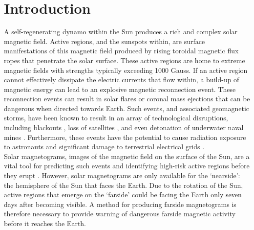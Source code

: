 \documentclass[11pt,a4paper,onecolumn]{report}
\begin{document}





\tableofcontents









%
%
%
%
\chapter{Introduction}
%
%
%
%

A self-regenerating dynamo within the Sun produces a rich and complex solar
magnetic field. Active regions, and the sunspots within, are surface
manifestations of this magnetic field produced by rising toroidal magnetic flux
ropes that penetrate the solar surface. These active regions are home to extreme
magnetic fields with strengths typically exceeding 1000 Gauss. If an active
region cannot effectively dissipate the electric currents that flow within, a
build-up of magnetic energy can lead to an explosive magnetic reconnection
event. These reconnection events can result in solar flares or coronal mass
ejections that can be dangerous when directed towards Earth. Such events, and
associated geomagnetic storms, have been known to result in an array of
technological disruptions, including blackouts \citep{odenwald_day_2015}, loss
of satellites \citep{carlowicz_did_1997}, and even detonation of underwater
naval mines \citep{knipp_little-known_2018}. Furthermore, these events have the
potential to cause radiation exposure to astronauts \citep{hu_modeling_2009} and
significant damage to terrestrial electrical grids \citep{council_severe_2008}.
\\


Solar magnetograms, images of the magnetic field on the surface of the Sun, are
a vital tool for predicting such events and identifying high-risk active regions
before they erupt
\citep{song_statistical_2009,yuan_solar_2010,lan_automated_2012,bobra_solar_2015,
chen_identifying_2019}. However, solar magnetograms are only available for the
`nearside': the hemisphere of the Sun that faces the Earth. Due to the rotation
of the Sun, active regions that emerge on the `farside' could be facing the
Earth only seven days after becoming visible. A method for producing farside
magnetograms is therefore necessary to provide warning of dangerous farside
magnetic activity before it reaches the Earth. \\
\end{document}
